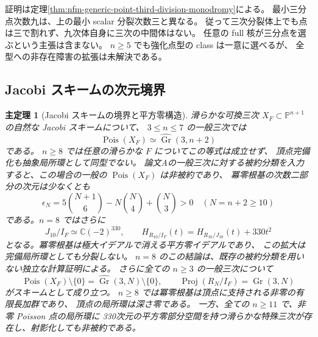 \documentclass[11pt,a4paper]{ltjsarticle}
\numberwithin{equation}{section}
\newtheorem{maintheorem}{主定理}
\newcommand{\C}{\mathbb C}
\newcommand{\PP}{\mathbb P}
\begin{document}
証明は定理\ref{thm:nfm-generic-point-third-division-monodromy}による。
最小三分点次数九は、上の最小 scalar 分裂次数三と異なる。
従って三次分裂体上でも点は三で割れず、九次体自身に三次の中間体はない。
任意の full 核が三分点を選ぶという主張は含まない。
$n\ge5$ でも強化点型の class は一意に選べるが、
全型への非存在障害の拡張は未解決である。

\subsection{Jacobi スキームの次元境界}
\begin{maintheorem}[Jacobi スキームの境界と平方零構造]
滑らかな可換三次 $X_F\subset\PP^{n+1}$ の自然な Jacobi スキームについて、
$3\le n\le7$ の一般三次では
\[
 \operatorname{Pois}(X_F)\simeq\widehat{\operatorname{Gr}}(3,n+2)
\]
である。
$n\ge8$ では任意の滑らかな $F$ についてこの等式は成立せず、
頂点完備化も抽象局所環として同型でない。
論文Aの一般三次に対する被約分類を入力すると、この場合の一般の
$\operatorname{Pois}(X_F)$ は非被約であり、
冪零根基の次数二部分の次元は少なくとも
\[
 \epsilon_N=5\binom{N+1}{6}-N\binom N4+\binom N3>0\quad(N=n+2\ge10)
\]
である。$n=8$ ではさらに
\[
 J_{10}/I_F\simeq\C(-2)^{330},\qquad
 H_{R_{10}/I_F}(t)=H_{R_{10}/J_{10}}(t)+330t^2
\]
となる。冪零根基は極大イデアルで消える平方零イデアルであり、
この拡大は完備局所環としても分裂しない。
$n=8$ のこの結論は、既存の被約分類を用いない独立な計算証明による。
さらに全ての $n\ge3$ の一般三次について
\[
 \operatorname{Pois}(X_F)\setminus\{0\}
 =\widehat{\operatorname{Gr}}(3,N)\setminus\{0\},\qquad
 \operatorname{Proj}(R_N/I_F)=\operatorname{Gr}(3,N)
\]
がスキームとして成り立つ。
$n\ge8$ では冪零根基は頂点に支持される非零の有限長加群であり、
頂点の局所環は深さ零である。
一方、全ての $n\ge11$ で、非零 Poisson 点の局所環に
330次元の平方零部分空間を持つ滑らかな特殊三次が存在し、射影化しても非被約である。
\end{maintheorem}
\end{document}
